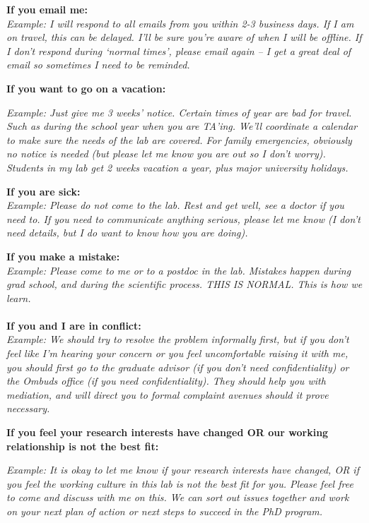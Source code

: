 \documentclass[]{article}
\begin{document}
\textbf{{If you email me:}\\
} \emph{Example: I will respond to all emails from you within 2-3
business days. If I am on travel, this can be delayed. I'll be sure
you're aware of when I will be offline. If I don't respond during
`normal times', please email again -- I get a great deal of email so
sometimes I need to be reminded.}

\textbf{{If you want to go on a vacation:}}

\emph{Example: Just give me 3 weeks' notice. Certain times of year are
bad for travel. Such as during the school year when you are TA'ing.
We'll coordinate a calendar to make sure the needs of the lab are
covered. For family emergencies, obviously no notice is needed (but
please let me know you are out so I don't worry). Students in my lab get
2 weeks vacation a year, plus major university holidays.}

\textbf{{If you are sick:}\\
}\emph{Example: Please do not come to the lab. Rest and get well, see a
doctor if you need to. If you need to communicate anything serious,
please let me know (I don't need details, but I do want to know how you
are doing).}

\textbf{{If you make a mistake:}\\
}\emph{Example: Please come to me or to a postdoc in the lab. Mistakes
happen during grad school, and during the scientific process. THIS IS
NORMAL. This is how we learn.}\textbf{\\
{~\\
If you and I are in conflict:}}{\\
}\emph{Example: We should try to resolve the problem informally first,
but if you don't feel like I'm hearing your concern or you feel
uncomfortable raising it with me, you should first go to the graduate
advisor (if you don't need confidentiality) or the Ombuds office (if you
need confidentiality). They should help you with mediation, and will
direct you to formal complaint avenues should it prove necessary.}

\textbf{{If you feel your research interests have changed OR our working
relationship is not the best fit:}}

\emph{Example: It is okay to let me know if your research interests have
changed, OR if you feel the working culture in this lab is not the best
fit for you. Please feel free to come and discuss with me on this. We
can sort out issues together and work on your next plan of action or
next steps to succeed in the PhD program.}
\end{document}
